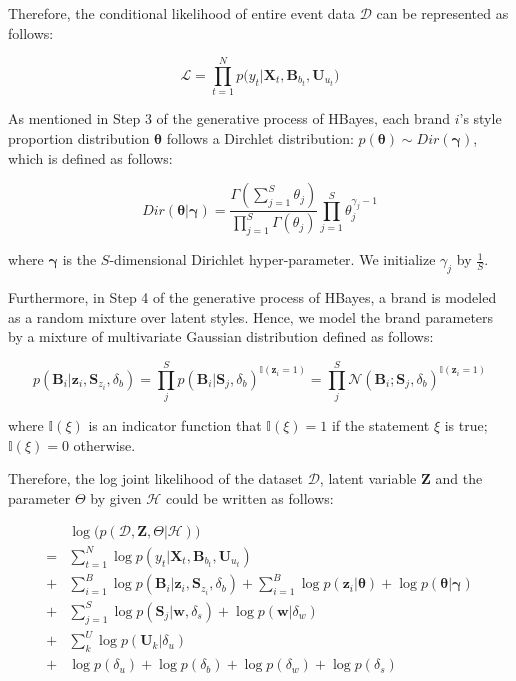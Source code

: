 Therefore, the conditional likelihood of entire event data $\mathcal{D}$ can be represented as follows:

\begin{equation}
\mathcal{L} = \prod_{t=1}^N p\big(y_t|\bm{X}_t,\bm{B}_{b_t},\bm{U}_{u_t} \big)
\end{equation}

As mentioned in Step 3 of the generative process of HBayes, each brand $i$'s style proportion distribution $\boldsymbol{\theta}$ follows a Dirchlet distribution: $p(\boldsymbol{\theta}) \sim Dir(\boldsymbol{\gamma})$, which is defined as follows: 

\begin{equation}
Dir(\bm{\theta}|\bm{\gamma})=\frac{\Gamma(\sum_{j=1}^{S}\theta_j)}{\prod_{j=1}^{S}\Gamma(\theta_j)}\prod_{j=1}^S \theta_j^{\gamma_j-1}
\end{equation}

\noindent where $\bm{\gamma}$ is the $S$-dimensional Dirichlet hyper-parameter. We initialize $\gamma_j$ by $\frac{1}{S}$. 

Furthermore, in Step 4 of the generative process of HBayes, a brand is modeled as a random mixture over latent styles. Hence, we model the brand parameters by a mixture of multivariate Gaussian distribution defined as follows:

\begin{equation}
p(\bm{B}_i|\bm{z}_i,\bm{S}_{z_i},\delta_b) = \prod_{j}^S p(\bm{B}_i|\bm{S}_j,\delta_b)^{\mathbb{I}(\bm{z}_i=1)} = \prod_{j}^S \mathcal{N}(\bm{B}_i; \bm{S}_j,\delta_b) ^{\mathbb{I}(\bm{z}_i=1)}
\end{equation}

\noindent where $\mathbb{I}(\xi)$ is an indicator function that $\mathbb{I}(\xi)=1$ if the statement $\xi$ is true; $\mathbb{I}(\xi)=0$ otherwise.

Therefore, the log joint likelihood of the dataset $\mathcal{D}$, latent variable $\bm{Z}$ and the parameter $\Theta$ by given $\mathcal{H}$ could be written as follows:

\begin{align}
 & \log \big( p(\mathcal{D},\bm{Z},\Theta|\mathcal{H}) \big) \\
= & \sum_{t=1}^N \log p(y_t|\bm{X}_t,\bm{B}_{b_t},\bm{U}_{u_t})  \\ 
+ &  \sum_{i=1}^B \log p(\bm{B}_i|\bm{z}_i,\bm{S}_{z_i},\delta_b) + \sum_{i=1}^B \log p(\bm{z}_{i}|\bm{\theta}) + \log p(\bm{\theta}|\bm{\gamma})  \\
+ & \sum_{j=1}^S \log p(\bm{S}_j|\bm{w},\delta_s) + \log p(\bm{w}|\delta_w)  \\
+ & \sum_{k}^U \log p(\bm{U}_k|\delta_u)   \\
+ & \log p(\delta_u) + \log p(\delta_b) + \log p(\delta_w) + \log p(\delta_s)
\label{joint_p}
\end{align}


